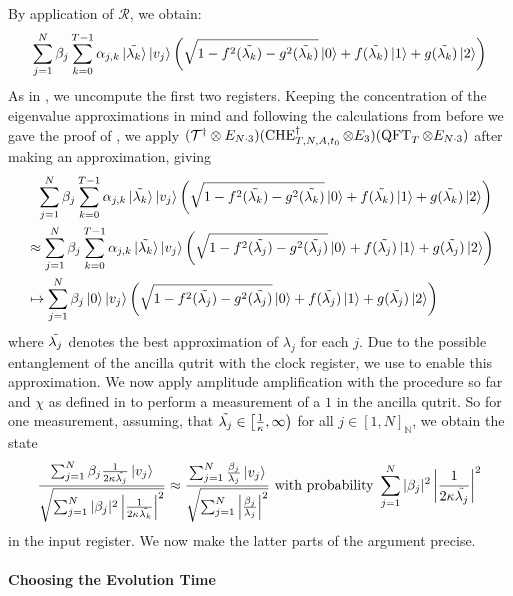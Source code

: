 By application of \(\mathcal{R}\), we obtain:
\begin{align}
    \sum_{j = 1}^N \beta_j \sum_{k = 0}^{T-1} \alpha_{j, k} \ket*{\tilde{\lambda_k}} \ket{v_j} \left(\sqrt{1-f^2(\tilde{\lambda_k})-g^2(\tilde{\lambda_k})}\ket{0}+f(\tilde{\lambda_k})\ket{1}+g(\tilde{\lambda_k})\ket{2}\right)
\end{align}
As in , we uncompute the first two registers. Keeping the concentration of the eigenvalue approximations in mind and following the calculations from before we gave the proof of , we apply \((\mathcal{T}^\dagger \otimes E_{N \cdot 3})(\operatorname{CHE}_{T, N, A, t_0}^\dagger \otimes E_3)(\operatorname{QFT}_T \otimes E_{N \cdot 3})\) after making an approximation, giving
\begin{align}
    &\phantom{\approx} \sum_{j = 1}^N \beta_j \sum_{k = 0}^{T-1} \alpha_{j, k} \ket*{\tilde{\lambda_k}} \ket{v_j} \left(\sqrt{1-f^2(\tilde{\lambda_k})-g^2(\tilde{\lambda_k})}\ket{0}+f(\tilde{\lambda_k})\ket{1}+g(\tilde{\lambda_k})\ket{2}\right)\\
    &\approx \sum_{j = 1}^N \beta_j \sum_{k = 0}^{T-1} \alpha_{j, k} \ket*{\tilde{\lambda_k}} \ket{v_j} \left(\sqrt{1-f^2(\tilde{\lambda_j})-g^2(\tilde{\lambda_j})}\ket{0}+f(\tilde{\lambda_j})\ket{1}+g(\tilde{\lambda_j})\ket{2}\right)\\
    &\mapsto \sum_{j = 1}^N \beta_j \ket{0} \ket{v_j} \left(\sqrt{1-f^2(\tilde{\lambda_j})-g^2(\tilde{\lambda_j})}\ket{0}+f(\tilde{\lambda_j})\ket{1}+g(\tilde{\lambda_j})\ket{2}\right)
\end{align}
where \(\tilde{\lambda_j}\) denotes the best approximation of \(\lambda_j\) for each \(j\). Due to the possible entanglement of the ancilla qutrit with the clock register, we use  to enable this approximation. We now apply amplitude amplification with the procedure so far and \(\chi\) as defined in  to perform a measurement of a \(1\) in the ancilla qutrit. So for one measurement, assuming, that \(\tilde{\lambda_j} \in \left[\frac{1}{\kappa}, \infty\right)\) for all \(j \in [1, N]_{\mathbb{N}}\), we obtain the state
\begin{align}
    \frac{\sum_{j=1}^N \beta_j \frac{1}{2 \kappa \tilde{\lambda_j}} \ket{v_j}}{\sqrt{\sum_{j=1}^N |\beta_j|^2 \left|\frac{1}{2 \kappa \tilde{\lambda_k}}\right|^2}} \approx \frac{\sum_{j=1}^N \frac{\beta_j}{\lambda_j} \ket{v_j}}{\sqrt{\sum_{j=1}^N \left|\frac{\beta_j}{\lambda_j}\right|^2}} \text{ with probability } \sum_{j=1}^N |\beta_j|^2 \left|\frac{1}{2 \kappa \tilde{\lambda_j}}\right|^2
\end{align}
in the input register. We now make the latter parts of the argument precise.

\paragraph*{Choosing the Evolution Time} \phantom{}\\\phantom{}

